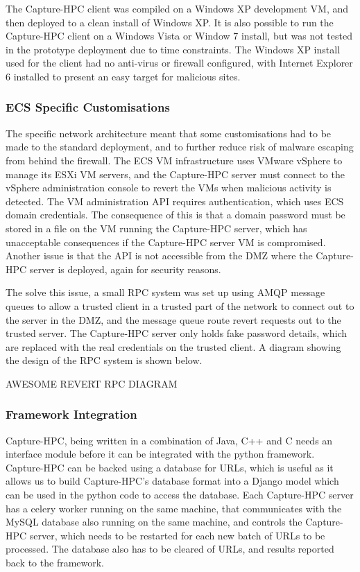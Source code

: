 The Capture-HPC client was compiled on a Windows XP development VM, and then
deployed to a clean install of Windows XP. It is also possible to run the
Capture-HPC client on a Windows Vista or Window 7 install, but was not tested in
the prototype deployment due to time constraints. The Windows XP install used
for the client had no anti-virus or firewall configured, with Internet Explorer
6 installed to present an easy target for malicious sites.

\subsubsection{ECS Specific Customisations}

The specific network architecture meant that some customisations had to be made
to the standard deployment, and to further reduce risk of malware escaping from
behind the firewall. The ECS VM infrastructure uses VMware vSphere to manage its
ESXi VM servers, and the Capture-HPC server must connect to the vSphere
administration console to revert the VMs when malicious activity is detected.
The VM administration API requires authentication, which uses ECS domain
credentials. The consequence of this is that a domain password must be stored in
a file on the VM running the Capture-HPC server, which has unacceptable
consequences if the Capture-HPC server VM is compromised. Another issue is that
the API is not accessible from the DMZ where the Capture-HPC server is deployed,
again for security reasons.

The solve this issue, a small RPC system was set up using AMQP message queues to
allow a trusted client in a trusted part of the network to connect out to the
server in the DMZ, and the message queue route revert requests out to the
trusted server. The Capture-HPC server only holds fake password details, which
are replaced with the real credentials on the trusted client. A diagram showing
the design of the RPC system is shown below. 

AWESOME REVERT RPC DIAGRAM

\subsubsection{Framework Integration}

Capture-HPC, being written in a combination of Java, C++ and C needs an
interface module before it can be integrated with the python framework.
Capture-HPC can be backed using a database for URLs, which is useful as it
allows us to build Capture-HPC's database format into a Django model which can
be used in the python code to access the database. Each Capture-HPC server has a
celery worker running on the same machine, that communicates with the MySQL
database also running on the same machine, and controls the Capture-HPC
server, which needs to be restarted for each new batch of URLs to be processed.
The database also has to be cleared of URLs, and results reported back to the
framework.

